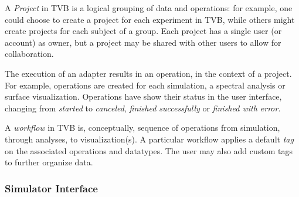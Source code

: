 \documentclass{bioinfo}
\begin{document}
		A \emph{Project} in TVB is a logical grouping of data and operations: 
        for example, one could choose to
		create a project for each experiment in TVB, while others might
		create projects for each subject of a group. Each project has a single
		user (or account) as owner, but a project may be shared
		with other users to allow for collaboration.

		The execution of an adapter results in an operation, in the
		context of a project. For example, operations are created for each
		simulation, a spectral analysis or surface visualization. 
        Operations have show their status in the user interface, changing from
		\emph{started} to \emph{canceled}, \emph{finished successfully} or
		\emph{finished with error}. 

		A \emph{workflow} in TVB is, conceptually, sequence of operations from simulation,
        through analyses, to visualization(s). A particular workflow applies
		 a default \emph{tag} on the associated operations and
		datatypes.
        The user may also add custom tags to further organize data.

		\subsubsection{Simulator Interface}
\end{document}
